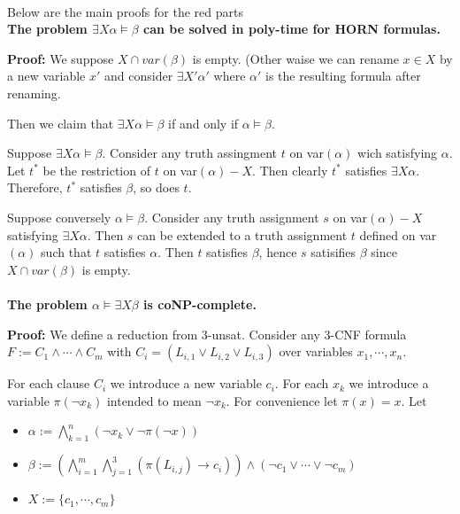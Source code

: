 \documentclass[12pt]{article}
\begin{document}
\ \ \\

Below are the main proofs for the red parts\\ 



{\bf The problem $\exists X \alpha \models \beta$ can be solved in poly-time for HORN formulas.} 

{\bf Proof:} We suppose $X\cap var(\beta)$ is empty. (Other waise we can rename $x\in X$ by a new variable $x'$ and consider $\exists X'\alpha'$ where $\alpha'$ is the resulting formula after renaming.

Then we claim that $\exists X\alpha\models \beta$ if and only if $\alpha\models\beta$. 

Suppose $\exists X\alpha\models \beta$. Consider any truth assingment $t$ on var$(\alpha)$ wich satisfying $\alpha$. Let $t^*$ be the restriction of $t$ on var$(\alpha)-X$. Then clearly $t^*$ satisfies $\exists X\alpha$. Therefore, $t^*$ satisfies $\beta$, so does $t$. 

Suppose conversely $\alpha\models\beta$. Consider any truth assignment $s$ on var$(\alpha)-X$ satisfying $\exists X\alpha$. Then $s$ can be extended to a truth assignment $t$ defined on var$(\alpha)$ such that $t$ satisfies $\alpha$. Then $t$ satisfies $\beta$, hence $s$ satisifies $\beta$ since $X\cap var(\beta)$ is empty.\\ \\


{\bf The problem $\alpha\models\exists X\beta$ is coNP-complete.}

{\bf Proof:} We define a reduction from 3-unsat. Consider any 3-CNF formula $F:=C_1\wedge\cdots\wedge C_m$ with $C_i=(L_{i,1}\vee L_{i,2}\vee L_{i,3})$ over variables $x_1,\cdots, x_n$.

For each clause $C_i$ we introduce a new variable $c_i$. For each $x_k$ we introduce a variable $\pi(\neg x_k)$ intended to mean $\neg x_k$. For convenience let $\pi(x)=x$. Let 

\begin{itemize}
\item $\alpha:=\bigwedge_{k=1}^{n} (\neg x_k\vee \neg \pi(\neg x)) $

\item $\beta:=\left(\bigwedge_{i=1}^{m}\bigwedge_{j=1}^{3}\left(\pi(L_{i,j})\rightarrow c_i\right)\right)\wedge (\neg c_1\vee\cdots\vee\neg c_m)$

\item $X:=\{c_1,\cdots,c_m\}$
\end{itemize}
\end{document}
